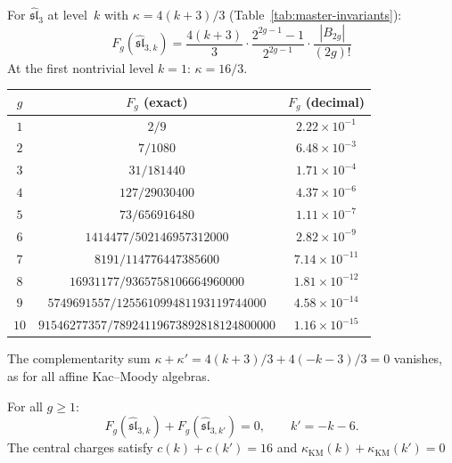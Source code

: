 \begin{computation}\label{comp:sl3-genus-expansion}

For $\widehat{\mathfrak{sl}}_3$ at level~$k$ with $\kappa = 4(k+3)/3$ (Table~\ref{tab:master-invariants}):
\begin{equation}\label{eq:sl3-Fg}
F_g(\widehat{\mathfrak{sl}}_{3,k}) = \frac{4(k+3)}{3} \cdot \frac{2^{2g-1}-1}{2^{2g-1}} \cdot \frac{|B_{2g}|}{(2g)!}
\end{equation}
At the first nontrivial level $k = 1$: $\kappa = 16/3$.
\begin{center}
\renewcommand{\arraystretch}{1.3}
\begin{tabular}{ccc}
\toprule
$g$ & $F_g$ (exact) & $F_g$ (decimal) \\
\midrule
$1$ & $2/9$ & $2.22 \times 10^{-1}$ \\
$2$ & $7/1080$ & $6.48 \times 10^{-3}$ \\
$3$ & $31/181440$ & $1.71 \times 10^{-4}$ \\
$4$ & $127/29030400$ & $4.37 \times 10^{-6}$ \\
$5$ & $73/656916480$ & $1.11 \times 10^{-7}$ \\
$6$ & $1414477/502146957312000$ & $2.82 \times 10^{-9}$ \\
$7$ & $8191/114776447385600$ & $7.14 \times 10^{-11}$ \\
$8$ & $16931177/9365758106664960000$ & $1.81 \times 10^{-12}$ \\
$9$ & $5749691557/125561099481193119744000$ & $4.58 \times 10^{-14}$ \\
$10$ & $91546277357/78924119673892818124800000$ & $1.16 \times 10^{-15}$ \\
\bottomrule
\end{tabular}
\end{center}
The complementarity sum $\kappa + \kappa' = 4(k+3)/3 + 4(-k-3)/3 = 0$ vanishes, as for all affine Kac--Moody algebras.
\end{computation}

\begin{proposition}%

\label{prop:sl3-complementarity-all-genera}
For all $g \geq 1$:
\begin{equation}\label{eq:sl3-complementarity-allgenera}
F_g(\widehat{\mathfrak{sl}}_{3,k}) + F_g(\widehat{\mathfrak{sl}}_{3,k'}) = 0,
\qquad k' = -k-6.
\end{equation}
The central charges satisfy $c(k) + c(k') = 16$ and
$\kappa_{\mathrm{KM}}(k) + \kappa_{\mathrm{KM}}(k') = 0$ \end{proposition}

